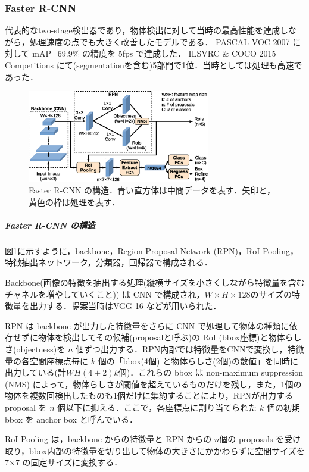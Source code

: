 \documentclass[twocolumn]{jsarticle} %
\begin{document}
\subsubsection{Faster R-CNN \cite{RHGS15}}
代表的なtwo-stage検出器であり，物体検出に対して当時の最高性能を達成しながら，処理速度の点でも大きく改善したモデルである．
PASCAL VOC 2007 に対して mAP=69.9\% の精度を 5fps で達成した．
ILSVRC \& COCO 2015 Competitions にて(segmentationを含む)5部門で1位．当時としては処理も高速であった．
\begin{figure}[tb]
    \begin{center}
        \includegraphics[width=8cm,clip]{fig/archi_FasterRCNN.eps}
    \end{center}
    \caption{ Faster R-CNN の構造．青い直方体は中間データを表す．矢印と，黄色の枠は処理を表す．}
    \label{fig:archi_FasterRCNN}
\end{figure}

\subparagraph{Faster R-CNN の構造} 図\ref{fig:archi_FasterRCNN}に示すように，backbone，Region Proposal Network (RPN)，RoI Pooling，特徴抽出ネットワーク，分類器，回帰器で構成される．

Backbone(画像の特徴を抽出する処理(縦横サイズを小さくしながら特徴量を含むチャネルを増やしていくこと)) は CNN で構成され，$W{\times}H{\times}128$のサイズの特徴量を出力する．提案当時はVGG-16 \cite{SimZis15}などが用いられた．

RPN は backbone が出力した特徴量をさらに CNN で処理して物体の種類に依存せずに物体を検出してその候補(proposalと呼ぶ)の RoI (bbox座標)と物体らしさ(objectness)を $n$ 個ずつ出力する．RPN内部では特徴量をCNNで変換し，特徴量の各空間座標点毎に $k$ 個の「bbox(4個) と物体らしさ(2個)の数値」を同時に出力している(計$WH(4{+}2)k$個)．これらの bbox は non-maximum suppression (NMS) によって，物体らしさが閾値を超えているものだけを残し，また，1個の物体を複数回検出したものも1個だけに集約することにより，RPNが出力するproposal を $n$ 個以下に抑える．ここで，各座標点に割り当てられた $k$ 個の初期 bbox を anchor box と呼んでいる．

RoI Pooling は，backbone からの特徴量と RPN からの $n$個の proposals を受け取り，bbox内部の特徴量を切り出して物体の大きさにかかわらずに空間サイズを 7{$\times$}7 の固定サイズに変換する．
\end{document}
